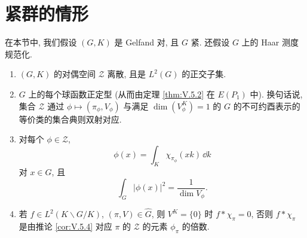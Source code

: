\section{紧群的情形}
在本节中, 我们假设 $(G, K)$ 是 Gelfand 对, 且 $G$ 紧. 还假设 $G$ 上的 Haar 测度规范化.

\begin{theorem}[紧 Gelfand 对]
\label{thm:V.7.1}
\begin{enumerate}
\item[(i)] $(G, K)$ 的对偶空间 $\mathcal{Z}$ 离散, 且是 $L^2(G)$ 的正交子集.
\item[(ii)] $G$ 上的每个球函数正定型 (从而由定理 \ref{thm:V.5.2} 在 $E(P_1)$ 中). 换句话说, 集合 $\mathcal{Z}$ 通过 $\phi \longmapsto (\pi_{\phi}, V_{\phi})$ 与满足 $\dim(V_{\phi}^K) = 1$ 的 $G$ 的不可约酉表示的等价类的集合典则双射对应.
\item[(iii)] 对每个 $\phi \in \mathcal{Z}$,
\[
\phi(x) = \int_K\chi_{\pi_{\phi}}(xk)\,\dd k
\]
对 $x \in G$, 且
\[
\int_G|\phi(x)|^2 = \frac{1}{\dim V_{\phi}}.
\]
\item[(iv)] 若 $f \in L^2(K\backslash G/K)$, $(\pi, V) \in \widehat{G}$, 则 $V^K = \{0\}$ 时 $f * \chi_{\pi} = 0$, 否则 $f * \chi_{\pi}$ 是由推论 \ref{cor:V.5.4} 对应 $\pi$ 的 $\mathcal{Z}$ 的元素 $\phi_{\pi}$ 的倍数.
\end{enumerate}
\end{theorem}

